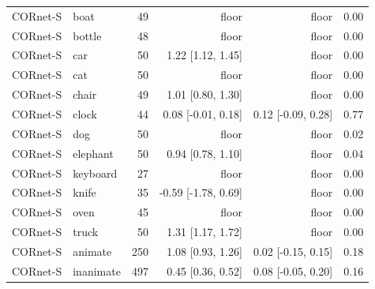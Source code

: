 \begin{tabular}{llrrrr}
CORnet-S & boat & 49 & floor & floor & 0.00 \\
CORnet-S & bottle & 48 & floor & floor & 0.00 \\
CORnet-S & car & 50 & 1.22 [1.12, 1.45] & floor & 0.00 \\
CORnet-S & cat & 50 & floor & floor & 0.00 \\
CORnet-S & chair & 49 & 1.01 [0.80, 1.30] & floor & 0.00 \\
CORnet-S & clock & 44 & 0.08 [-0.01, 0.18] & 0.12 [-0.09, 0.28] & 0.77 \\
CORnet-S & dog & 50 & floor & floor & 0.02 \\
CORnet-S & elephant & 50 & 0.94 [0.78, 1.10] & floor & 0.04 \\
CORnet-S & keyboard & 27 & floor & floor & 0.00 \\
CORnet-S & knife & 35 & -0.59 [-1.78, 0.69] & floor & 0.00 \\
CORnet-S & oven & 45 & floor & floor & 0.00 \\
CORnet-S & truck & 50 & 1.31 [1.17, 1.72] & floor & 0.00 \\
CORnet-S & animate & 250 & 1.08 [0.93, 1.26] & 0.02 [-0.15, 0.15] & 0.18 \\
CORnet-S & inanimate & 497 & 0.45 [0.36, 0.52] & 0.08 [-0.05, 0.20] & 0.16 \\
\hline
\end{tabular}